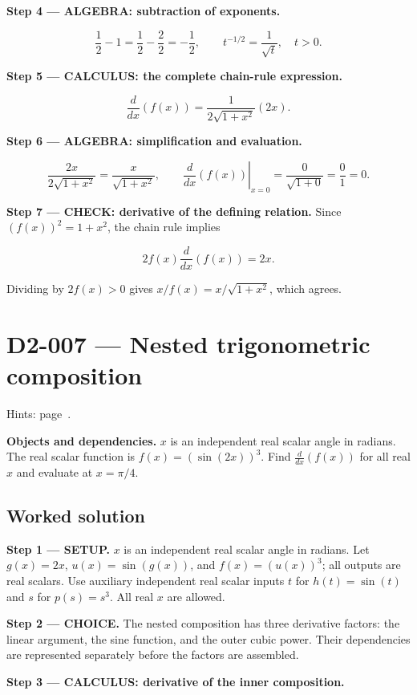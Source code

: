 \documentclass[11pt,oneside,openany]{book}
\begin{document}
\begingroup\color{AlgebraBlue}
\textbf{Step 4 --- ALGEBRA: subtraction of exponents.}

\[
\frac12-1=\frac12-\frac22=-\frac12,
\qquad t^{-1/2}=\frac1{\sqrt t},\quad t>0.
\]

\endgroup
\textbf{Step 5 --- CALCULUS: the complete chain-rule expression.}

\[
\frac{d}{dx}\left(f(x)\right)=\frac1{2\sqrt{1+x^2}}(2x).
\]

\begingroup\color{AlgebraBlue}
\textbf{Step 6 --- ALGEBRA: simplification and evaluation.}

\[
\frac{2x}{2\sqrt{1+x^2}}=\frac{x}{\sqrt{1+x^2}},\qquad
\left.\frac{d}{dx}\left(f(x)\right)\right|_{x=0}
=\frac0{\sqrt{1+0}}=\frac01=0.
\]

\endgroup
\textbf{Step 7 --- CHECK: derivative of the defining relation.} Since \((f(x))^2=1+x^2\),
the chain rule implies

\[
2f(x)\frac{d}{dx}\left(f(x)\right)=2x.
\]

Dividing by \(2f(x)>0\) gives \(x/f(x)=x/\sqrt{1+x^2}\), which agrees.
\clearpage
\section{D2-007 --- Nested trigonometric composition}
\label{problem:D2-007}
{\small Hints: page~\pageref{hints:D2-007}.}\par\medskip

\textbf{Objects and dependencies.} \(x\) is an independent real scalar angle in radians.
The real scalar function is \(f(x)=(\sin(2x))^3\). Find
\(\frac{d}{dx}\left(f(x)\right)\) for all real \(x\) and evaluate at \(x=\pi/4\).
\subsection*{Worked solution}

\textbf{Step 1 --- SETUP.} \(x\) is an independent real scalar angle in radians.
Let \(g(x)=2x\), \(u(x)=\sin(g(x))\), and \(f(x)=(u(x))^3\); all outputs are real
scalars. Use auxiliary independent real scalar inputs \(t\) for \(h(t)=\sin(t)\)
and \(s\) for \(p(s)=s^3\). All real \(x\) are allowed.

\begin{ChoiceStep}
\textbf{Step 2 --- CHOICE.} The nested composition has three derivative factors: the linear
argument, the sine function, and the outer cubic power. Their dependencies
are represented separately before the factors are assembled.

\end{ChoiceStep}
\textbf{Step 3 --- CALCULUS: derivative of the inner composition.}
\end{document}

